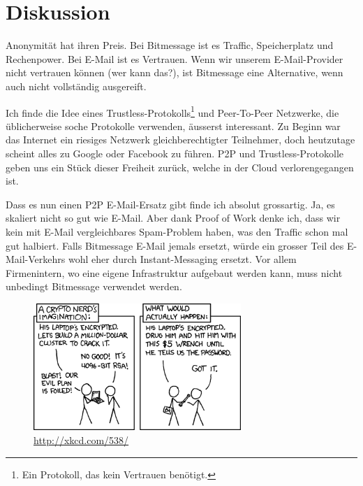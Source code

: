 \documentclass{bfh}
\begin{document}
  \newpage
  \section{Diskussion}

  Anonymität hat ihren Preis. Bei Bitmessage ist es Traffic, Speicherplatz und Rechenpower. Bei E-Mail ist es Vertrauen. Wenn wir unserem E-Mail-Provider nicht vertrauen können (wer kann das?), ist Bitmessage eine Alternative, wenn auch nicht vollständig ausgereift.

  Ich finde die Idee eines Trustless-Protokolls\footnote{Ein Protokoll, das kein Vertrauen benötigt.} und Peer-To-Peer Netzwerke, die üblicherweise soche Protokolle verwenden, äusserst interessant. Zu Beginn war das Internet ein riesiges Netzwerk gleichberechtigter Teilnehmer, doch heutzutage scheint alles zu Google oder Facebook zu führen. P2P und Trustless-Protokolle geben uns ein Stück dieser Freiheit zurück, welche in der Cloud verlorengegangen ist.

  Dass es nun einen P2P E-Mail-Ersatz gibt finde ich absolut grossartig. Ja, es skaliert nicht so gut wie E-Mail. Aber dank Proof of Work denke ich, dass wir kein mit E-Mail vergleichbares Spam-Problem haben, was den Traffic schon mal gut halbiert. Falls Bitmessage E-Mail jemals ersetzt, würde ein grosser Teil des E-Mail-Verkehrs wohl eher durch Instant-Messaging ersetzt. Vor allem Firmenintern, wo eine eigene Infrastruktur aufgebaut werden kann, muss nicht unbedingt Bitmessage verwendet werden.

  \begin{figure}[htp]
  \centering
  \includegraphics[width=0.7\textwidth]{images/xkcd-security.png}
  \caption[XKCD: Security]{\url{http://xkcd.com/538/}\nocite{xkcd:538}}
  \label{fig:xkcd}
  \end{figure}

  \newpage
  
  
  \listoffigures
\end{document}
